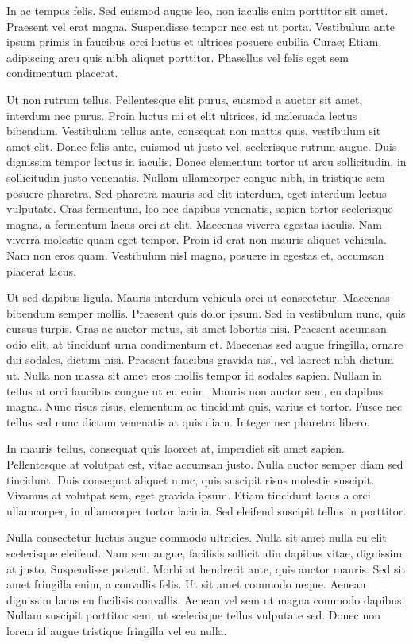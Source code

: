 In ac tempus felis. Sed euismod augue leo, non iaculis enim porttitor
sit amet. Praesent vel erat magna. Suspendisse tempor nec est ut
porta. Vestibulum ante ipsum primis in faucibus orci luctus et
ultrices posuere cubilia Curae; Etiam adipiscing arcu quis nibh
aliquet porttitor. Phasellus vel felis eget sem condimentum placerat.

Ut non rutrum tellus. Pellentesque elit purus, euismod a auctor sit
amet, interdum nec purus. Proin luctus mi et elit ultrices, id
malesuada lectus bibendum. Vestibulum tellus ante, consequat non
mattis quis, vestibulum sit amet elit. Donec felis ante, euismod ut
justo vel, scelerisque rutrum augue. Duis dignissim tempor lectus in
iaculis. Donec elementum tortor ut arcu sollicitudin, in sollicitudin
justo venenatis. Nullam ullamcorper congue nibh, in tristique sem
posuere pharetra. Sed pharetra mauris sed elit interdum, eget interdum
lectus vulputate. Cras fermentum, leo nec dapibus venenatis, sapien
tortor scelerisque magna, a fermentum lacus orci at elit. Maecenas
viverra egestas iaculis. Nam viverra molestie quam eget tempor. Proin
id erat non mauris aliquet vehicula. Nam non eros quam. Vestibulum
nisl magna, posuere in egestas et, accumsan placerat lacus.

Ut sed dapibus ligula. Mauris interdum vehicula orci ut
consectetur. Maecenas bibendum semper mollis. Praesent quis dolor
ipsum. Sed in vestibulum nunc, quis cursus turpis. Cras ac auctor
metus, sit amet lobortis nisi. Praesent accumsan odio elit, at
tincidunt urna condimentum et. Maecenas sed augue fringilla, ornare
dui sodales, dictum nisi. Praesent faucibus gravida nisl, vel laoreet
nibh dictum ut. Nulla non massa sit amet eros mollis tempor id sodales
sapien. Nullam in tellus at orci faucibus congue ut eu enim. Mauris
non auctor sem, eu dapibus magna. Nunc risus risus, elementum ac
tincidunt quis, varius et tortor. Fusce nec tellus sed nunc dictum
venenatis at quis diam. Integer nec pharetra libero.

In mauris tellus, consequat quis laoreet at, imperdiet sit amet
sapien. Pellentesque at volutpat est, vitae accumsan justo. Nulla
auctor semper diam sed tincidunt. Duis consequat aliquet nunc, quis
suscipit risus molestie suscipit. Vivamus at volutpat sem, eget
gravida ipsum. Etiam tincidunt lacus a orci ullamcorper, in
ullamcorper tortor lacinia. Sed eleifend suscipit tellus in porttitor.

Nulla consectetur luctus augue commodo ultricies. Nulla sit amet nulla
eu elit scelerisque eleifend. Nam sem augue, facilisis sollicitudin
dapibus vitae, dignissim at justo. Suspendisse potenti. Morbi at
hendrerit ante, quis auctor mauris. Sed sit amet fringilla enim, a
convallis felis. Ut sit amet commodo neque. Aenean dignissim lacus eu
facilisis convallis. Aenean vel sem ut magna commodo dapibus. Nullam
suscipit porttitor sem, ut scelerisque tellus vulputate sed. Donec non
lorem id augue tristique fringilla vel eu nulla.
